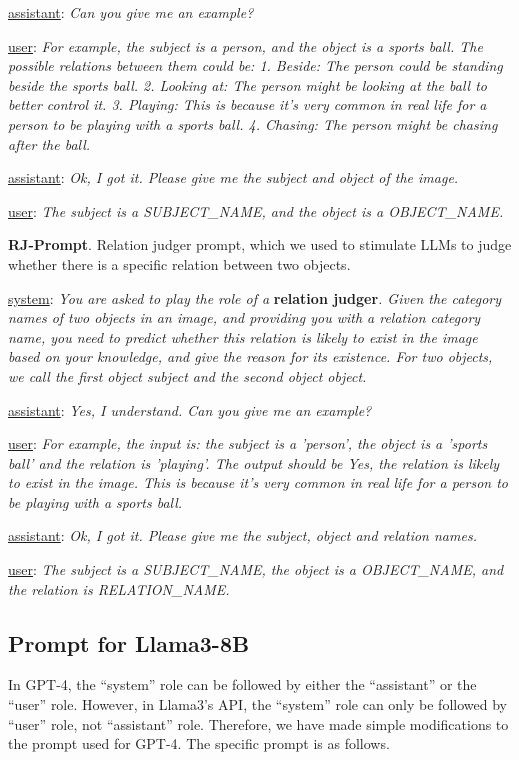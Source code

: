 \underline{assistant}: \textit{Can you give me an example?}

\underline{user}: \textit{For example, the subject is a person, and the object is a sports ball. The possible relations between them could be: 1. Beside: The person could be standing beside the sports ball. 2. Looking at: The person might be looking at the ball to better control it. 3. Playing: This is because it's very common in real life for a person to be playing with a sports ball. 4. Chasing: The person might be chasing after the ball.}

\underline{assistant}: \textit{Ok, I got it. Please give me the subject and object of the image.}

\underline{user}: \textit{The subject is a SUBJECT\_NAME, and the object is a OBJECT\_NAME.}


\noindent \textbf{RJ-Prompt}.
Relation judger prompt, which we used to stimulate LLMs to judge whether there is a specific relation between two objects.

\underline{system}: \textit{You are asked to play the role of a} \textbf{relation judger}\textit{. Given the category names of two objects in an image, and providing you with a relation category name, you need to predict whether this relation is likely to exist in the image based on your knowledge, and give the reason for its existence. For two objects, we call the first object subject and the second object object.}

\underline{assistant}: \textit{Yes, I understand. Can you give me an example?}

\underline{user}: \textit{For example, the input is: the subject is a 'person', the object is a 'sports ball' and the relation is 'playing'. The output should be Yes, the relation is likely to exist in the image. This is because it's very common in real life for a person to be playing with a sports ball.}

\underline{assistant}: \textit{Ok, I got it. Please give me the subject, object and relation names.}

\underline{user}: \textit{The subject is a SUBJECT\_NAME, the object is a OBJECT\_NAME, and the relation is RELATION\_NAME.}


\subsection{Prompt for Llama3-8B}
\label{sec:prompt_llama}
In GPT-4, the ``system'' role can be followed by either the ``assistant'' or the ``user'' role.
However, in Llama3's API, the ``system'' role can only be followed by ``user'' role, not ``assistant'' role.
Therefore, we have made simple modifications to the prompt used for GPT-4. The specific prompt is as follows.

